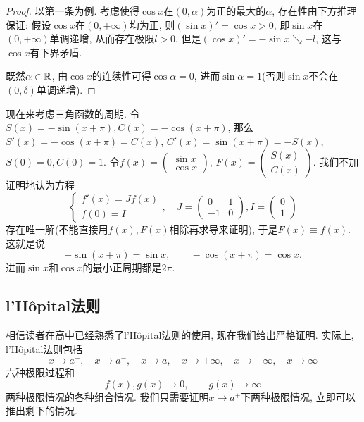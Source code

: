 \begin{proof}
	以第一条为例. 考虑使得$\cos x$在$(0,\alpha)$为正的最大的$\alpha$, 存在性由下方推理保证: 假设$\cos x$在$(0,+\infty)$均为正, 则$(\sin x)' = \cos x>0$, 即$\sin x$在$(0,+\infty)$单调递增, 从而存在极限$l>0$. 但是$(\cos x)' = -\sin x \searrow -l$, 这与$\cos x$有下界矛盾. 
	
	既然$\alpha \in \mathbb{R}$, 由$\cos x$的连续性可得$\cos \alpha=0$, 进而$\sin \alpha =1$(否则$\sin x$不会在$(0,\delta)$单调递增). 
\end{proof}

现在来考虑三角函数的周期. 令$S(x)=-\sin (x+\pi), C(x)=-\cos (x+\pi)$, 那么$S'(x) = -\cos (x+\pi) = C(x)$, $C'(x) = \sin (x+\pi) = -S(x)$, $S(0)=0, C(0)=1$. 令$f(x)=\begin{pmatrix}
	\sin x \\ \cos x
\end{pmatrix}$, $F(x) = \begin{pmatrix}
	S(x) \\ C(x)
\end{pmatrix}$. 我们不加证明地认为方程$$\begin{cases}
	f'(x)=Jf(x) \\ f(0)=I
\end{cases},\quad J=\begin{pmatrix}
		0 & 1 \\ -1 & 0
	\end{pmatrix}, I=\begin{pmatrix}
		0 \\ 1
	\end{pmatrix}$$存在唯一解(不能直接用$f(x),F(x)$相除再求导来证明), 于是$F(x) \equiv f(x)$. 这就是说$$-\sin (x+\pi) = \sin x,\qquad -\cos (x+\pi) = \cos x. $$
进而$\sin x$和$\cos x$的最小正周期都是$2\pi$. 

\subsection{l’Hôpital法则}

相信读者在高中已经熟悉了l’Hôpital法则的使用, 现在我们给出严格证明. 实际上, l’Hôpital法则包括$$x \to a^+, \quad x\to a^-, \quad x \to a, \quad x \to +\infty , \quad x \to - \infty , \quad x \to \infty$$
六种极限过程和$$f(x),g(x) \to 0,\qquad g(x) \to \infty$$
两种极限情况的各种组合情况. 我们只需要证明$x \to a^+$下两种极限情况, 立即可以推出剩下的情况. 

